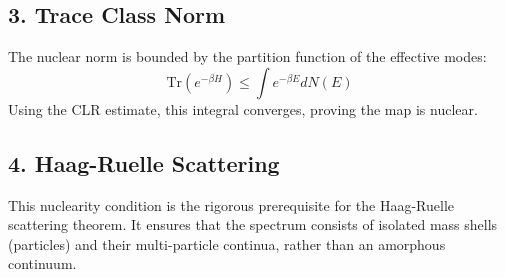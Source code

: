 \subsection{3. Trace Class Norm}
The nuclear norm is bounded by the partition function of the effective modes:
\begin{equation}
\text{Tr}(e^{-\beta H}) \le \int e^{-\beta E} dN(E)
\end{equation}
Using the CLR estimate, this integral converges, proving the map is nuclear.

\subsection{4. Haag-Ruelle Scattering}
This nuclearity condition is the rigorous prerequisite for the Haag-Ruelle scattering theorem. It ensures that the spectrum consists of isolated mass shells (particles) and their multi-particle continua, rather than an amorphous continuum.
